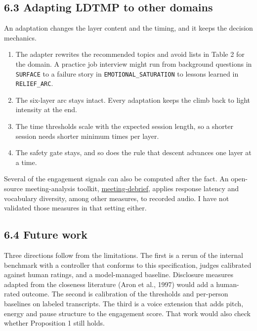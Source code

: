 \documentclass[11pt]{article}
\providecommand{\tightlist}{\setlength{\itemsep}{0pt}\setlength{\parskip}{0pt}}
\begin{document}
\subsection{6.3 Adapting LDTMP to other domains}

An adaptation changes the layer content and the timing, and it keeps the
decision mechanics.

\begin{enumerate}
\def\labelenumi{\arabic{enumi}.}
\tightlist
\item
  The adapter rewrites the recommended topics and avoid lists in Table 2
  for the domain. A practice job interview might run from background
  questions in \texttt{SURFACE} to a failure story in
  \texttt{EMOTIONAL\_\allowbreak{}SATURATION} to lessons learned in
  \texttt{RELIEF\_\allowbreak{}ARC}.
\item
  The six-layer arc stays intact. Every adaptation keeps the climb back
  to light intensity at the end.
\item
  The time thresholds scale with the expected session length, so a
  shorter session needs shorter minimum times per layer.
\item
  The safety gate stays, and so does the rule that descent advances one
  layer at a time.
\end{enumerate}

Several of the engagement signals can also be computed after the fact.
An open-source meeting-analysis toolkit,
\href{https://github.com/amilovidov/meeting-debrief}{meeting-debrief},
applies response latency and vocabulary diversity, among other measures,
to recorded audio. I have not validated those measures in that setting
either.

\subsection{6.4 Future work}

Three directions follow from the limitations. The first is a rerun of
the internal benchmark with a controller that conforms to this
specification, judges calibrated against human ratings, and a
model-managed baseline. Disclosure measures adapted from the closeness
literature (Aron et al., 1997) would add a human-rated outcome. The
second is calibration of the thresholds and per-person baselines on
labeled transcripts. The third is a voice extension that adds pitch,
energy and pause structure to the engagement score. That work would also
check whether Proposition 1 still holds.
\end{document}
